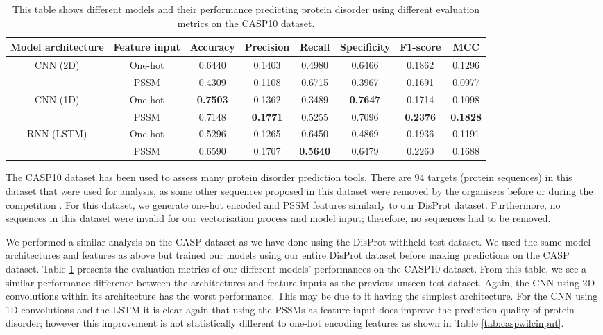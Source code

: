 \documentclass{l4proj}
\begin{document}
\begin{table}[!htb]
    \centering
    \caption{This table shows different models and their performance predicting protein disorder using different evaluation metrics on the CASP10 dataset.}
    \begin{tabular}{@{}cccccccc@{}}
    \toprule
    Model architecture & Feature input & Accuracy & Precision & Recall & Specificity & F1-score & MCC \\ \midrule
    \multirow{2}{*}{CNN (2D)} & One-hot & 0.6440 & 0.1403 & 0.4980 & 0.6466 & 0.1862 & 0.1296 \\
     & PSSM & 0.4309 & 0.1108 & 0.6715 & 0.3967 & 0.1691 & 0.0977 \\
    \multirow{2}{*}{CNN (1D)} & One-hot & \textbf{0.7503} & 0.1362 & 0.3489 & \textbf{0.7647} & 0.1714 & 0.1098 \\
     & PSSM & 0.7148 & \textbf{0.1771} & 0.5255 & 0.7096 & \textbf{0.2376} & \textbf{0.1828} \\
    \multirow{2}{*}{RNN (LSTM)} & One-hot & 0.5296 & 0.1265 & 0.6450 & 0.4869 & 0.1936 & 0.1191 \\
     & PSSM & 0.6590 & 0.1707 & \textbf{0.5640} & 0.6479 & 0.2260 & 0.1688 \\ \cmidrule(l){1-8}
    \end{tabular}
    
    \label{tab:caspDataset}
\end{table}

The CASP10 dataset has been used to assess many protein disorder prediction tools. There are 94 targets (protein sequences) in this dataset that were used for analysis, as some other sequences proposed in this dataset were removed by the organisers before or during the competition \citep{Moult:14}. For this dataset, we generate one-hot encoded and PSSM features similarly to our DisProt dataset. Furthermore, no sequences in this dataset were invalid for our vectorisation process and model input; therefore, no sequences had to be removed.

We performed a similar analysis on the CASP dataset as we have done using the DisProt withheld test dataset. We used the same model architectures and features as above but trained our models using our entire DisProt dataset before making predictions on the CASP dataset. Table \ref{tab:caspDataset} presents the evaluation metrics of our different models' performances on the CASP10 dataset. From this table, we see a similar performance difference between the architectures and feature inputs as the previous unseen test dataset. Again, the CNN using 2D convolutions within its architecture has the worst performance. This may be due to it having the simplest architecture. For the CNN using 1D convolutions and the LSTM it is clear again that using the PSSMs as feature input does improve the prediction quality of protein disorder; however this improvement is not statistically different to one-hot encoding features as shown in Table \ref{tab:caspwilcinput}.
\end{document}
